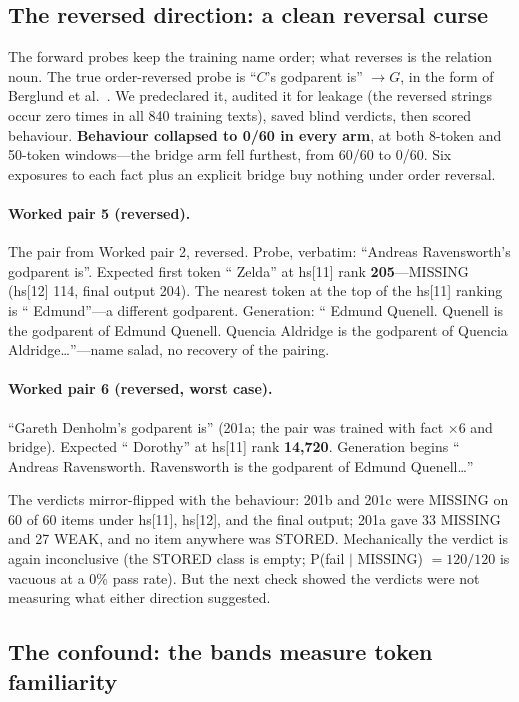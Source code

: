 \documentclass[11pt]{article}
\begin{document}
\subsection{The reversed direction: a clean reversal curse}

The forward probes keep the training name order; what reverses is the
relation noun. The true order-reversed probe is ``$C$'s godparent
is'' $\to G$, in the form of Berglund et al.\ \cite{berglund2023}. We
predeclared it, audited it for leakage (the reversed strings occur zero
times in all 840 training texts), saved blind verdicts, then scored
behaviour. \textbf{Behaviour collapsed to 0/60 in every arm}, at both
8-token and 50-token windows---the bridge arm fell furthest, from 60/60
to 0/60. Six exposures to each fact plus an explicit bridge buy nothing
under order reversal.

\paragraph{Worked pair 5 (reversed).}
The pair from Worked pair 2, reversed. Probe, verbatim: ``Andreas
Ravensworth's godparent is''. Expected first token `` Zelda'' at
hs[11] rank \textbf{205}---MISSING (hs[12] 114, final output 204). The
nearest token at the top of the hs[11] ranking is `` Edmund''---a
different godparent. Generation: `` Edmund Quenell. Quenell is the
godparent of Edmund Quenell. Quencia Aldridge is the godparent of
Quencia Aldridge\ldots''---name salad, no recovery of the pairing.

\paragraph{Worked pair 6 (reversed, worst case).}
``Gareth Denholm's godparent is'' (201a; the pair was trained with
fact $\times 6$ and bridge). Expected `` Dorothy'' at hs[11] rank
\textbf{14,720}. Generation begins `` Andreas Ravensworth.
Ravensworth is the godparent of Edmund Quenell\ldots''

The verdicts mirror-flipped with the behaviour: 201b and 201c were
MISSING on 60 of 60 items under hs[11], hs[12], and the final output;
201a gave 33 MISSING and 27 WEAK, and no item anywhere was STORED.
Mechanically the verdict is again inconclusive (the STORED class is
empty; P(fail $\mid$ MISSING) $= 120/120$ is vacuous at a 0\% pass
rate). But the next check showed the verdicts were not measuring what
either direction suggested.

\subsection{The confound: the bands measure token familiarity}
\end{document}
